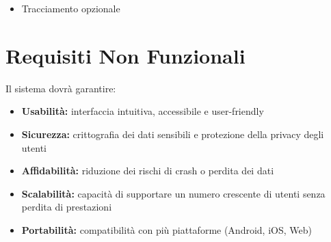 \documentclass[11pt,a4paper]{article}
\begin{document}
    \begin{itemize}
        \item Tracciamento opzionale
    \end{itemize}


    \section*{Requisiti Non Funzionali}

    Il sistema dovrà garantire:

    \begin{itemize}

        \item \textbf{Usabilità:} interfaccia intuitiva, accessibile e user-friendly

        \item \textbf{Sicurezza:} crittografia dei dati sensibili e protezione della privacy degli utenti

        \item \textbf{Affidabilità:} riduzione dei rischi di crash o perdita dei dati

        \item \textbf{Scalabilità:} capacità di supportare un numero crescente di utenti senza perdita di prestazioni

        \item \textbf{Portabilità:} compatibilità con più piattaforme (Android, iOS, Web)

    \end{itemize}
\end{document}
